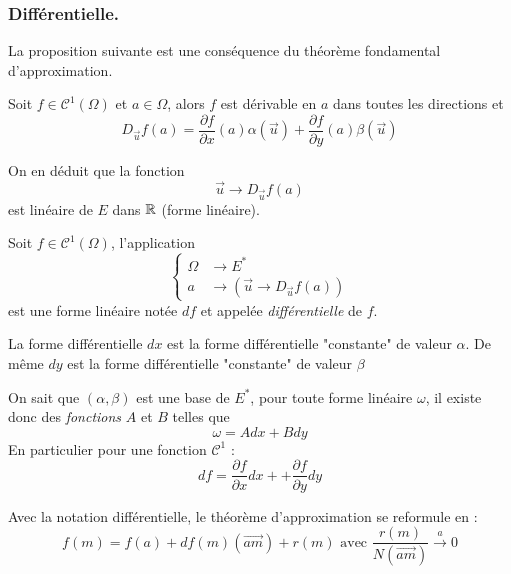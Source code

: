 \subsubsection{Différentielle.}
La proposition suivante est une conséquence du théorème fondamental d'approximation.
\begin{prop}
 Soit $f\in \mathcal C^1(\Omega)$ et $a\in \Omega$, alors $f$ est dérivable en $a$ dans toutes les directions et
\begin{displaymath}
 D_{\overrightarrow u}f(a) = 
\dfrac{\partial f}{\partial x}(a)\alpha(\overrightarrow u)
+\dfrac{\partial f}{\partial y}(a)\beta(\overrightarrow u)
\end{displaymath}
\end{prop}
On en déduit que la fonction
\begin{displaymath}
 \overrightarrow u \rightarrow D_{\overrightarrow u}f(a)
\end{displaymath}
est linéaire de $E$ dans $\mathbb{R}$ (forme linéaire).
\begin{defi}
 Soit $f\in \mathcal C^1(\Omega)$, l'application 
\begin{displaymath}
 \left\lbrace 
\begin{aligned}
 \Omega &\rightarrow E^* \\
 a &\rightarrow \left( \overrightarrow u \rightarrow D_{\overrightarrow u}f(a)  \right) 
\end{aligned}
\right. 
\end{displaymath}
est une forme linéaire notée $df$ et appelée \emph{différentielle} de $f$.
\end{defi}
\begin{prop}
 La forme différentielle $dx$ est la forme différentielle "constante" de valeur $\alpha$. De même 
$dy$ est la forme différentielle "constante" de valeur $\beta$
\end{prop}
On sait que $(\alpha, \beta)$ est une base de $E^*$, pour toute forme linéaire $\omega$, il existe donc des \emph{fonctions} $A$ et $B$ telles que 
\begin{displaymath}
 \omega = Adx + Bdy
\end{displaymath}
En particulier pour une fonction $\mathcal C^1$ :
\begin{displaymath}
 df = \dfrac{\partial f}{\partial x}dx ++\dfrac{\partial f}{\partial y}dy
\end{displaymath}
\begin{rem}
 Avec la notation différentielle, le théorème d'approximation se reformule en :
\begin{displaymath}
 f(m) = f(a) + df(m)(\overrightarrow{am})+r(m) \text{ avec } \frac{r(m)}{N(\overrightarrow{am})} \xrightarrow{a} 0
\end{displaymath}

\end{rem}
